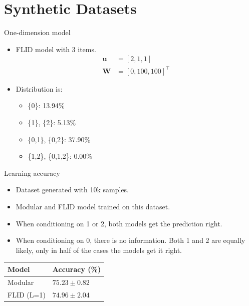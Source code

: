 \documentclass{beamer}
\begin{document}
\section{Synthetic Datasets}

\begin{frame}{One-dimension model}
  \begin{itemize}
    \item FLID model with 3 items.
    \begin{align*}
      \mathbf{u} &= [2,1,1] \\
      \mathbf{W} &= [0,100,100]^\intercal
    \end{align*}
    \item Distribution is:
      \begin{itemize}
        \item \{0\}: 13.94\%
        \item \{1\}, \{2\}: 5.13\%
        \item \{0,1\}, \{0,2\}: 37.90\%
        \item \{1,2\}, \{0,1,2\}: 0.00\%
      \end{itemize}
  \end{itemize}
\end{frame}

\begin{frame}{Learning accuracy}
  \begin{itemize}
    \item Dataset generated with 10k samples.
    \item Modular and FLID model trained on this dataset.
    \item When conditioning on 1 or 2, both models get the prediction right.
    \item When conditioning on 0, there is no information. Both 1 and 2 are equally likely, only in half of the cases the models get it right.
  \end{itemize}
  \begin{table}
    \centering
    \begin{tabular}{@{}ll@{}}
      \hline
      \textbf{Model} & \textbf{Accuracy (\%)}\\
      \hline
      Modular & $75.23 \pm 0.82$ \\
      FLID (L=1) & $74.96 \pm 2.04$ \\
      \hline
    \end{tabular}
  \end{table}
\end{frame}
\end{document}

